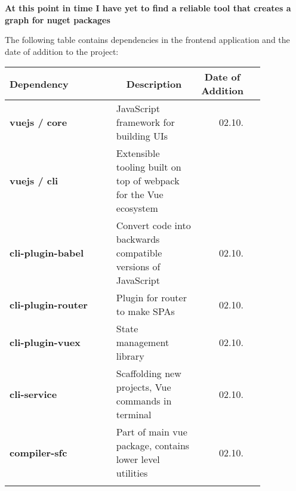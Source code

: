 {\color{red} \textbf{At this point in time I have yet to find a reliable tool that creates a graph for nuget packages}}

The following table contains dependencies in the frontend application and the date of addition to the project:

\begin{table}[h!]
\centering
    \begin{tabular}{ p{0.45\linewidth} p{0.35\linewidth} r p{0.05\linewidth} }
      \toprule
      Dependency & \multicolumn{1}{c}{Description} & \multicolumn{1}{c}{Date of Addition} \\
      
      \midrule
      \addlinespace[0.2cm]
      
      \textbf{vuejs / core} & JavaScript framework for building UIs & 02.10. \\
      
      \addlinespace[0.2cm]
      \midrule
      \addlinespace[0.2cm]
      
      \textbf{vuejs / cli} & Extensible tooling built on top of webpack for the Vue ecosystem & \\
      
      \addlinespace[0.2cm]
      
      \textbf{cli-plugin-babel} & Convert code into backwards compatible versions of JavaScript & 02.10. \\
      
      \addlinespace[0.2cm]
      
      \textbf{cli-plugin-router} & Plugin for router to make SPAs & 02.10. \\
      
      \addlinespace[0.2cm]
      
      \textbf{cli-plugin-vuex} & State management library & 02.10. \\
      
      \addlinespace[0.2cm]
      
      \textbf{cli-service} & Scaffolding new projects, Vue commands in terminal & 02.10. \\
      
      \addlinespace[0.2cm]
      
      \textbf{compiler-sfc} & Part of main vue package, contains lower level utilities & 02.10. \\
      
      \addlinespace[0.2cm]
      \midrule
      \addlinespace[0.2cm]
      

\end{tabular}
\end{table}
